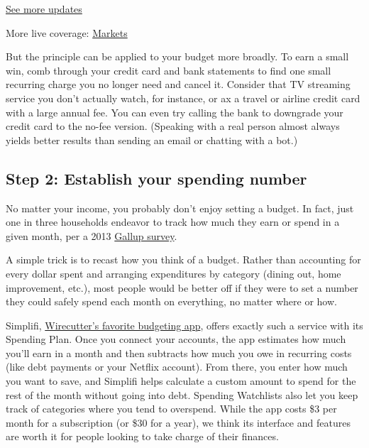 \href{https://www.nytimes.com/2020/08/04/world/coronavirus-cases.html?action=click\&pgtype=Article\&state=default\&region=MAIN_CONTENT_1\&context=storylines_live_updates}{See
more updates}

More live coverage:
\href{https://www.nytimes.com/live/2020/08/04/business/stock-market-today-coronavirus?action=click\&pgtype=Article\&state=default\&region=MAIN_CONTENT_1\&context=storylines_live_updates}{Markets}

But the principle can be applied to your budget more broadly. To earn a
small win, comb through your credit card and bank statements to find one
small recurring charge you no longer need and cancel it. Consider that
TV streaming service you don't actually watch, for instance, or ax a
travel or airline credit card with a large annual fee. You can even try
calling the bank to downgrade your credit card to the no-fee version.
(Speaking with a real person almost always yields better results than
sending an email or chatting with a bot.)

\hypertarget{step-2-establish-your-spending-number}{%
\subsection{Step 2: Establish your spending
number}\label{step-2-establish-your-spending-number}}

No matter your income, you probably don't enjoy setting a budget. In
fact, just one in three households endeavor to track how much they earn
or spend in a given month, per a 2013
\href{https://news.gallup.com/poll/162872/one-three-americans-prepare-detailed-household-budget.aspx}{Gallup
survey}.

A simple trick is to recast how you think of a budget. Rather than
accounting for every dollar spent and arranging expenditures by category
(dining out, home improvement, etc.), most people would be better off if
they were to set a number they could safely spend each month on
everything, no matter where or how.

Simplifi,
\href{https://www.nytimes.com/wirecutter/money/best-budgeting-apps-and-tools/?utm_source=nytimes\&utm_medium=referral\&utm_campaign=wcsmarterliving\&utm_content=covid-budget}{Wirecutter's
favorite budgeting app}, offers exactly such a service with its Spending
Plan. Once you connect your accounts, the app estimates how much you'll
earn in a month and then subtracts how much you owe in recurring costs
(like debt payments or your Netflix account). From there, you enter how
much you want to save, and Simplifi helps calculate a custom amount to
spend for the rest of the month without going into debt. Spending
Watchlists also let you keep track of categories where you tend to
overspend. While the app costs \$3 per month for a subscription (or \$30
for a year), we think its interface and features are worth it for people
looking to take charge of their finances.

